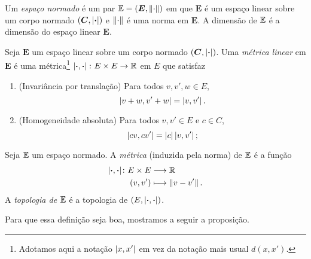 \begin{definition}
Um \emph{espaço normado} é um par $\mathbb{E} = (\bm E,\left\Vert{\cdot}\right\Vert)$ em que $\bm E$ é um espaço linear sobre um corpo normado $(\bm C,\left\vert{\bm{\cdot}}\right\vert)$ e $\left\Vert{\cdot}\right\Vert$ é uma norma em $\bm E$. A dimensão de $\mathbb{E}$ é a dimensão do espaço linear $\bm E$.
\end{definition}

\begin{definition}
Seja $\bm E$ um espaço linear sobre um corpo normado $(\bm C,\left\vert{\bm{\cdot}}\right\vert)$. Uma \emph{métrica linear} em $\bm E$ é uma métrica\footnote{Adotamos aqui a notação $\left\vert{x},{x'}\right\vert$ em vez da notação mais usual $d(x,x')$.} $\left\vert{\bm{\cdot}},{\bm{\cdot}}\right\vert\colon E \times E \to \mathbb{R}$ em $E$ que satisfaz
	\begin{enumerate}
	\item (Invariância por translação) Para todos $v,v',w \in E$,
		\begin{equation*}
		\left\vert{v+w},{v'+w}\right\vert = \left\vert{v},{v'}\right\vert.
		\end{equation*}
	\item (Homogeneidade absoluta) Para todos $v,v' \in E$ e $c \in C$,
		\begin{equation*}
		\left\vert{cv},{cv'}\right\vert = \left\vert{c}\right\vert\left\vert{v},{v'}\right\vert;
		\end{equation*}
	\end{enumerate}
\end{definition}

\begin{definition}
Seja $\mathbb{E}$ um espaço normado. A \emph{métrica} (induzida pela norma) de $\mathbb{E}$ é a função
	\begin{align*}
	{\left\vert{\bm{\cdot}},{\bm{\cdot}}\right\vert}\colon {E \times E} &\longrightarrow {\mathbb{R}} \\{(v,v')} &\longmapsto \left\Vert{v - v'}\right\Vert.
	\end{align*}	
A \emph{topologia de $\mathbb{E}$} é a topologia de $(E,\left\vert{\bm{\cdot}},{\bm{\cdot}}\right\vert)$.
\end{definition}

Para que essa definição seja boa, mostramos a seguir a proposição.

